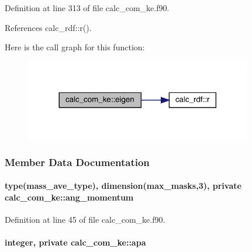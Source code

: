 Definition at line 313 of file calc\-\_\-com\-\_\-ke.\-f90.



References calc\-\_\-rdf\-::r().



Here is the call graph for this function\-:
\nopagebreak
\begin{figure}[H]
\begin{center}
\leavevmode
\includegraphics[width=281pt]{classcalc__com__ke_a103eff9968044cf67aae4fcef67d0192_cgraph}
\end{center}
\end{figure}




\subsubsection{Member Data Documentation}
\hypertarget{classcalc__com__ke_a64928951c01426eecbeff5f6310dbab9}{
\paragraph[{ang\-\_\-momentum}]{\setlength{\rightskip}{0pt plus 5cm}type({\bf mass\-\_\-ave\-\_\-type}), dimension({\bf max\-\_\-masks},3), private calc\-\_\-com\-\_\-ke\-::ang\-\_\-momentum\hspace{0.3cm}{\ttfamily [private]}}}\label{classcalc__com__ke_a64928951c01426eecbeff5f6310dbab9}


Definition at line 45 of file calc\-\_\-com\-\_\-ke.\-f90.

\hypertarget{classcalc__com__ke_a7be3639c20eb8ceb3a5180b4d48f22ab}{
\paragraph[{apa}]{\setlength{\rightskip}{0pt plus 5cm}integer, private calc\-\_\-com\-\_\-ke\-::apa\hspace{0.3cm}{\ttfamily [private]}}}\label{classcalc__com__ke_a7be3639c20eb8ceb3a5180b4d48f22ab}


